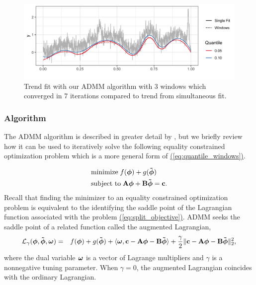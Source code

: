\documentclass[aoas]{imsart}
\newcommand{\Eqn}[1]{\hyperref[eq:#1]{{\rm (\ref*{eq:#1})}}} %
\newcommand{\Eqn}[1]{{(\ref{eq:#1})}} %
\newcommand{\V}[1]{{\bm{\mathbf{\MakeLowercase{#1}}}}} %
\newcommand{\Vtilde}[1]{{\bm{\tilde \mathbf{\MakeLowercase{#1}}}}} %
\newcommand{\M}[1]{{\bm{\mathbf{\MakeUppercase{#1}}}}} %
\begin{document}
 
 \begin{figure}
 	\centering
 	\includegraphics[width = 0.8\linewidth]{Figures/admm_windows.png}
 	\caption{Trend fit with our ADMM algorithm with 3 windows which converged in 7 iterations compared to trend from simultaneous fit.} 
 	\label{fig:windowsfit}
 \end{figure}
 
 
\subsubsection{Algorithm}
The ADMM algorithm \citep{gabay1975dual, glowinski1975approximation} is  described in greater detail by \cite{boyd2011distributed}, but we briefly review how it can be used to iteratively solve the following equality constrained optimization problem which is a more general form of \Eqn{quantile_windows}.

\begin{equation}
\label{eq:split_objective}
\begin{split}
&\text{minimize} \; f(\V{\phi}) + g(\Vtilde{\phi}) \\ 
&\text{subject to} \; \M{A}\V{\phi} + \M{B}\Vtilde{\phi} = \V{c}.
\end{split}
\end{equation}
Recall that finding the minimizer to an equality constrained optimization problem is equivalent to the identifying the saddle point of the Lagrangian function associated with the problem \Eqn{split_objective}. ADMM seeks the saddle point of a related function called the augmented Lagrangian,
\begin{eqnarray*}
	\mathcal{L}_{\gamma}(\V{\phi},\Vtilde{\phi},\V{\omega}) & = & f(\V{\phi}) + g(\Vtilde{\phi}) + \langle \V{\omega}, \V{c} - \M{A}\V{\phi} - \M{B}\Vtilde{\phi} \rangle
	+ \frac{\gamma}{2} \lVert \V{c} - \M{A}\V{\phi} - \M{B}\Vtilde{\phi} \rVert_2^2,
\end{eqnarray*}
where the dual variable $\V{\omega}$ is a vector of Lagrange multipliers and $\gamma$ is a nonnegative tuning parameter. When $\gamma = 0$, the augmented Lagrangian coincides with the ordinary Lagrangian.
\end{document}
